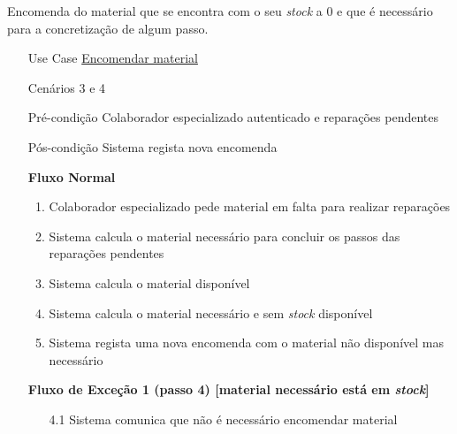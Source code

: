 \documentclass[../relatorio.tex]{subfiles}
\begin{document}
Encomenda do material que se encontra com o seu \textit{stock} a 0 e que é necessário para a concretização de algum passo.
\begin{itemize}
    \item[Use Case] {\underline{Encomendar material}}
    \item[Cenários] {3 e 4}
    \item[Pré-condição] {Colaborador especializado autenticado e reparações pendentes}
    \item[Pós-condição] {Sistema regista nova encomenda}
          \begin{flushleft}
              \textbf{Fluxo Normal}
          \end{flushleft}
          \begin{enumerate}
              \item Colaborador especializado pede material em falta para realizar reparações
              \item Sistema calcula o material necessário para concluir os passos das reparações pendentes
              \item Sistema calcula o material disponível
              \item Sistema calcula o material necessário e sem \textit{stock} disponível
              \item Sistema regista uma nova encomenda com o material não disponível mas necessário
          \end{enumerate}
          \begin{flushleft}
              \textbf{Fluxo de Exceção 1 (passo 4) [material necessário está em \textit{stock}]}
          \end{flushleft}
          \begin{itemize}
              \item[4.1] {Sistema comunica que não é necessário encomendar material}
          \end{itemize}
\end{itemize}
\end{document}

